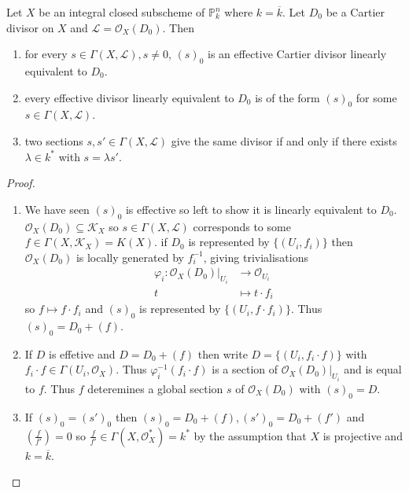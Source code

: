 \documentclass[a4paper]{article}
\renewcommand*{\P}{\mathbb{P}}
\newcommand{\sh}[1]{\mathcal{#1}} %
\begin{document}
\begin{theorem}
  Let \(X\) be an integral closed subscheme of \(\P^n_k\) where \(k = \overline k\). Let \(D_0\) be a Cartier divisor on \(X\) and \(\sh L = \sh O_X(D_0)\). Then
  \begin{enumerate}
  \item for every \(s \in \Gamma(X, \sh L), s \neq 0\), \((s)_0\) is an effective Cartier divisor linearly equivalent to \(D_0\).
  \item every effective divisor linearly equivalent to \(D_0\) is of the form \((s)_0\) for some \(s \in \Gamma(X, \sh L)\).
  \item two sections \(s, s' \in \Gamma(X, \sh L)\) give the same divisor if and only if there exists \(\lambda \in k^*\) with \(s = \lambda s'\).
  \end{enumerate}
\end{theorem}

\begin{proof}\leavevmode
  \begin{enumerate}
  \item We have seen \((s)_0\) is effective so left to show it is linearly equivalent to \(D_0\). \(\sh O_X(D_0) \subseteq \sh K_X\) so \(s \in \Gamma(X, \sh L)\) corresponds to some \(f \in \Gamma(X, \sh K_X) = K(X)\). if \(D_0\) is represented by \(\{(U_i, f_i)\}\) then \(\sh O_X(D_0)\) is locally generated by \(f_i^{-1}\), giving trivialisations
    \begin{align*}
      \varphi_i: \sh O_X(D_0)|_{U_i} &\to \sh O_{U_i} \\
      t &\mapsto t \cdot f_i
    \end{align*}
    so \(f \mapsto f \cdot f_i\) and \((s)_0\) is represented by \(\{(U_i, f \cdot f_i)\}\). Thus \((s)_0 = D_0 + (f)\).
  \item If \(D\) is effetive and \(D = D_0 + (f)\) then write \(D = \{(U_i, f_i \cdot f)\}\) with \(f_i \cdot f \in \Gamma(U_i, \sh O_X)\). Thus \(\varphi_i^{-1}(f_i \cdot f)\) is a section of \(\sh O_X(D_0)|_{U_i}\) and is equal to \(f\). Thus \(f\) deteremines a global section \(s\) of \(\sh O_X(D_0)\) with \((s)_0 = D\).
  \item If \((s)_0 = (s')_0\) then \((s)_0 = D_0 + (f), (s')_0 = D_0 + (f')\) and \((\frac{f}{f'}) = 0\) so \(\frac{f}{f'} \in \Gamma(X, \sh O_X^*) = k^*\) by the assumption that \(X\) is projective and \(k = \overline k\).
  \end{enumerate}
\end{proof}
\end{document}
